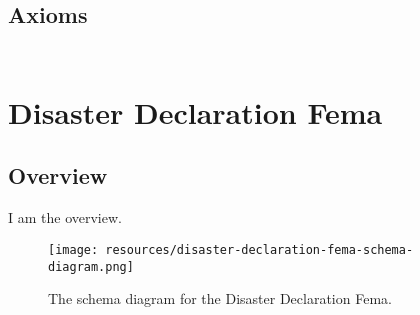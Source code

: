 \subsection{Axioms}
\begin{align}
\end{align}



\section{Disaster Declaration Fema}
\label{sec:disaster-declaration-fema}
\subsection{Overview}
\label{ssec:overview}

I am the overview.

\begin{figure}[h!]
  \begin{center}
    \texttt{[image: resources/disaster-declaration-fema-schema-diagram.png]}
  \end{center}
  \caption{The schema diagram for the Disaster Declaration Fema.}
  \label{fig:ov-diagram}
\end{figure}



